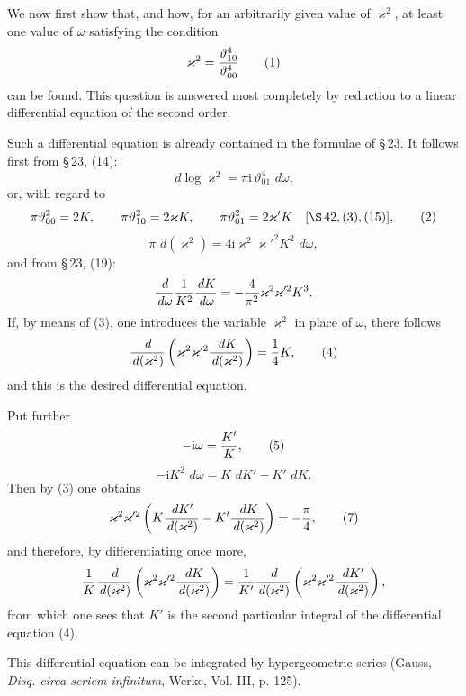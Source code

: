 \documentclass[11pt]{article}
\providecommand{\dd}{\,d}
\providecommand{\tht}{\vartheta}
\providecommand{\ii}{\mathrm{i}}
\begin{document}
We now first show that, and how, for an arbitrarily given value of $\varkappa^2$, at least one value of $\omega$ satisfying the condition
\begin{equation}
\varkappa^2={\tht_{10}^4\over\tht_{00}^4}
\tag{1}
\end{equation}
can be found. This question is answered most completely by reduction to a linear differential equation of the second order.

Such a differential equation is already contained in the formulae of \S\,23. It follows first from \S\,23, (14):
\[
\dd\log\varkappa^2=\pi\ii\,\tht_{01}^4\,\dd\omega,
\]
or, with regard to
\begin{equation}
\pi\tht_{00}^2=2K,
\qquad
\pi\tht_{10}^2=2\varkappa K,
\qquad
\pi\tht_{01}^2=2\varkappa'K
\quad[\S\,42,(3),(15)],
\tag{2}
\end{equation}
\begin{equation}
\pi\,\dd(\varkappa^2)=4\ii\varkappa^2\varkappa'^2K^2\,\dd\omega,
\tag{3}
\end{equation}
and from \S\,23, (19):
\[
{\dd\over\dd\omega}{1\over K^2}{\dd K\over\dd\omega}
=-{4\over\pi^2}\varkappa^2\varkappa'^2K^3.
\]
If, by means of (3), one introduces the variable $\varkappa^2$ in place of $\omega$, there follows
\begin{equation}
{\dd\over\dd(\varkappa^2)}
\left(\varkappa^2\varkappa'^2{\dd K\over\dd(\varkappa^2)}\right)
={1\over4}K,
\tag{4}
\end{equation}
and this is the desired differential equation.

Put further
\begin{equation}
-\ii\omega={K'\over K},
\tag{5}
\end{equation}
\begin{equation}
-\ii K^2\,\dd\omega=K\,\dd K'-K'\,\dd K.
\tag{6}
\end{equation}
Then by (3) one obtains
\begin{equation}
\varkappa^2\varkappa'^2\left(K{\dd K'\over\dd(\varkappa^2)}-K'{\dd K\over\dd(\varkappa^2)}\right)
=-{\pi\over4},
\tag{7}
\end{equation}
and therefore, by differentiating once more,
\[
{1\over K}{\dd\over\dd(\varkappa^2)}
\left(\varkappa^2\varkappa'^2{\dd K\over\dd(\varkappa^2)}\right)
={1\over K'}{\dd\over\dd(\varkappa^2)}
\left(\varkappa^2\varkappa'^2{\dd K'\over\dd(\varkappa^2)}\right),
\]
from which one sees that $K'$ is the second particular integral of the differential equation (4).

This differential equation can be integrated by hypergeometric series (Gauss, \emph{Disq. circa seriem infinitum}, Werke, Vol. III, p. 125).
\end{document}
